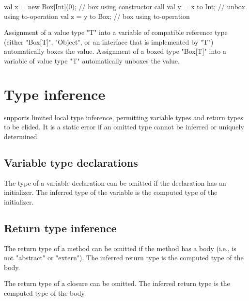 \begin{xten}
val x = new Box[Int](0); // box using constructor call
val y = x to Int;        // unbox using to-operation
val z = y to Box;        // box using to-operation
\end{xten}

Assignment of a value type \xcd"T" into a variable of compatible reference type
(either \xcd"Box[T]", \xcd"Object", or an interface that is
implemented by \xcd"T")
automatically boxes the value.  Assignment of a boxed type
\xcd"Box[T]" into
a variable of value type \xcd"T" automatically unboxes the value.


\section{Type inference}
\label{TypeInference}

\XtenCurrVer{} supports limited local type inference, permitting
variable types and return types to be elided.
It is a static error if an omitted type cannot be inferred or
uniquely determined.

\subsection{Variable type declarations}

The type of a variable declaration can be omitted if the
declaration has an initializer.  The inferred type of the
variable is the computed type of the initializer.

\subsection{Return type inference}

The return type of a method can be omitted if the method has a
body (i.e., is not \xcd"abstract" or \xcd"extern").  The
inferred return type is the computed type of the body.

The return type of a closure can be omitted.
The inferred return type is the computed type of the body.

